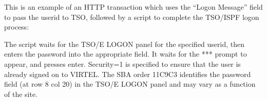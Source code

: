 \documentclass[letterpaper,10pt,english]{sphinxmanual}
\begin{document}

This is an example of an HTTP transaction which uses the “Logon Message” field to pass the userid to TSO, followed by a script to complete the TSO/ISPF logon process:

\begin{sphinxVerbatim}[commandchars=\\\{\}]
                         
                          
      
                          
                         
                                
      
        
\end{sphinxVerbatim}


The script waits for the TSO/E LOGON panel for the specified userid, then enters the password into the appropriate field. It waits for the *** prompt to appear, and presses enter. Security=1 is specified to ensure that the user is already signed on to VIRTEL. The SBA order 11C9C3 identifies the password field (at row 8 col 20) in the TSO/E LOGON panel and may vary as a function of the site.
\end{document}
